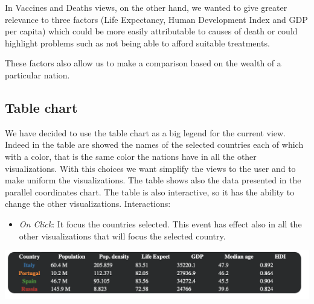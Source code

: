 \documentclass[10pt,conference]{IEEEtran}
\begin{document}
In Vaccines and Deaths views, on the other hand, we wanted to give greater relevance to three factors (Life Expectancy, Human Development Index and GDP per capita) which could be more easily attributable to causes of death or could highlight problems such as not being able to afford suitable treatments.

These factors also allow us to make a comparison based on the wealth of a particular nation.

\begin{figure}
\end{figure}


\subsection{Table chart}
We have decided to use the table chart as a big legend for the current view. Indeed in the table are showed the names of the selected countries each of which with a color, that is the same color the nations have in all the other visualizations. With this choices we want simplify the views to the user and to make uniform the visualizations.
The table shows also the data presented in the parallel coordinates chart. The table is also interactive, so it has the ability to change the other visualizations.
Interactions:
\begin{itemize}
	\item {\em On Click}: It focus the countries selected. This event has effect also in all the other visualizations that will focus the selected country.
\end{itemize}

\begin{center}
    \includegraphics[width=1\linewidth]{img/table.png} 
\end{center}
\end{document}

